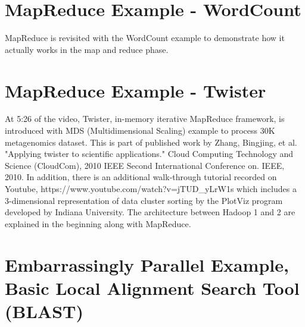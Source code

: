 
\section{MapReduce Example - WordCount}

MapReduce is revisited with the WordCount example to demonstrate how it
actually works in the map and reduce phase.


\section{MapReduce Example - Twister}

At 5:26 of the video, Twister, in-memory iterative MapReduce framework, is
introduced with MDS (Multidimensional Scaling) example to process 30K
metagenomics dataset. This is part of published work by Zhang, Bingjing, et al.
"Applying twister to scientific applications." Cloud Computing Technology and
Science (CloudCom), 2010 IEEE Second International Conference on. IEEE, 2010.
In addition, there is an additional walk-through tutorial recorded on Youtube,
https://www.youtube.com/watch?v=jTUD_yLrW1s which includes a 3-dimensional
representation of data cluster sorting by the PlotViz program developed by
Indiana University. The architecture between Hadoop 1 and 2 are explained in
the beginning along with MapReduce.


\section{Embarrassingly Parallel Example, Basic Local Alignment Search Tool (BLAST)}

